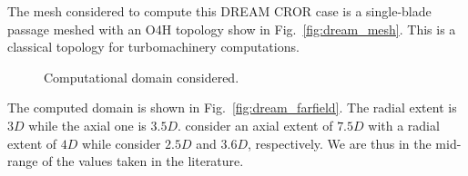 
The mesh considered to compute this
DREAM CROR case is a single-blade passage meshed
with an O4H topology show in Fig.~\ref{fig:dream_mesh}. This is a classical
topology for turbomachinery computations.
\begin{figure}[htb]
  \centering
  \caption{Computational domain considered.}
\end{figure}
The computed domain is shown in Fig.~\ref{fig:dream_farfield}.
The radial extent is $3D$ while the axial one is $3.5D$.
\citet{Peters2012} consider an axial extent of $7.5D$
with a radial extent of $4D$ while \citet{Zachariadis2011}
consider $2.5D$ and $3.6D$, respectively. We are thus in 
the mid-range of the values taken in the literature.

~

